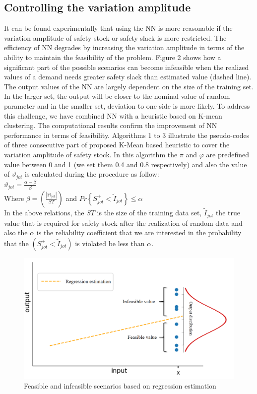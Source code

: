 \documentclass[letterpaper]{article} %
\begin{document}
\subsection{Controlling the variation amplitude}
It can be found experimentally that using the NN is more reasonable if the variation amplitude of safety stock or safety slack is more restricted. The efficiency of NN degrades by increasing the variation amplitude in terms of the ability to maintain the feasibility of the problem. Figure 2 shows how a significant part of the possible scenarios can become infeasible when the realized values of a demand needs greater safety slack than estimated value (dashed line). The output values of the NN are largely dependent on the size of the training set. In the larger set, the output will be closer to the nominal value of random parameter and in the smaller set, deviation to one side is more likely. To address this challenge, we have combined NN with a heuristic based on K-mean clustering. The computational results confirm the improvement of NN performance in terms of feasibility. Algorithms 1 to 3 illustrate the pseudo-codes of three consecutive part of proposed K-Mean based heuristic to cover the variation amplitude of safety stock. In this algorithm the $\pi$ and $\varphi$ are predefined value between 0 and 1 (we set them 0.4 and 0.8 respectively) and also the value of $\vartheta_{jot}$ is calculated during the procedure as follow:
\\
$\vartheta_{jot}=\frac{\alpha-\beta}{\beta}$
\\
Where $\beta=\left(\frac{|\mathbb{M}_{jot}|}{ST} \right)$ and $Pr\left\{S_{jot}^{+}<\tilde{I}_{jot}\right\}\leq\alpha$\\
In the above relations, the $ST$ is the size of the training data set, $\tilde{I}_{jot}$ the true value that is required for safety stock after the realization of random data and also the $\alpha$ is the reliability coefficient that we are interested in the probability that the $\left(S_{jot}^{+}<\tilde{I}_{jot}\right)$ is violated be less than $\alpha$. 
\begin{figure}[t]
\centering
\includegraphics[width=0.9\columnwidth]{figure/fig4.png} %
\caption{Feasible and infeasible scenarios based on regression estimation }
\label{fig3}
\end{figure}
\end{document}
